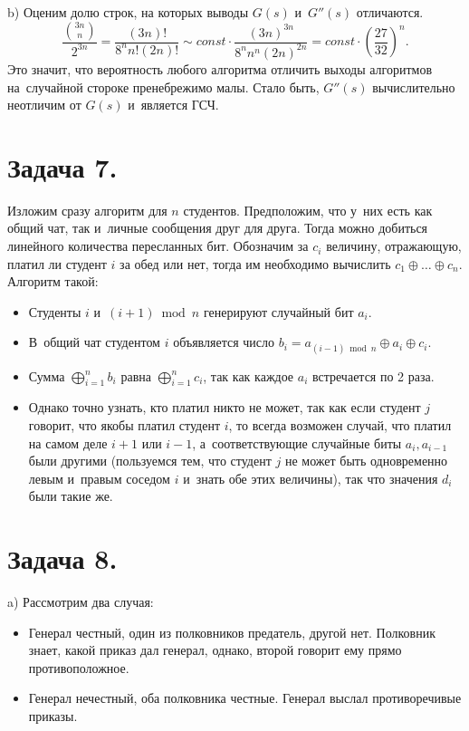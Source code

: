 \documentclass{article}
\begin{document}
b) Оценим долю строк, на которых выводы $G(s)$ и~$G''(s)$ отличаются.
$$\frac{{3n \choose n}}{2^{3n}} = \frac{(3n)!}{8^n n! (2n)!} \sim const \cdot
\frac{(3n)^{3n}}{8^n n^n (2n)^{2n}} = const \cdot
\left(\frac{27}{32}\right)^n.$$
Это значит, что вероятность любого алгоритма отличить выходы алгоритмов
на~случайной стороке пренебрежимо малы. Стало быть, $G''(s)$ вычислительно
неотличим от $G(s)$ и~является ГСЧ.

\section*{Задача 7.}

Изложим сразу алгоритм для $n$ студентов. Предположим, что у~них есть как общий
чат, так и~личные сообщения друг для друга. Тогда можно добиться линейного
количества пересланных бит. Обозначим за $c_i$ величину, отражающую, платил ли
студент $i$ за обед или нет, тогда им необходимо вычислить $c_1 \oplus \ldots
\oplus c_n$. Алгоритм такой:
\begin{itemize}
	\item Студенты $i$ и~$(i+1) \bmod n$ генерируют случайный бит $a_i$.
	\item В~общий чат студентом $i$ объявляется число $b_i = a_{(i-1) \bmod n}
		\oplus a_{i} \oplus c_i$.
	\item Сумма $\bigoplus\limits_{i=1}^n b_i$ равна $\bigoplus\limits_{i=1}^n
		c_i$, так как каждое $a_i$ встречается по 2 раза.
	\item Однако точно узнать, кто платил никто не может, так как если студент $j$
		говорит, что якобы платил студент $i$, то всегда возможен случай, что платил
		на самом деле $i+1$ или $i-1$, а~соответствующие случайные биты
		$a_i,a_{i-1}$ были другими (пользуемся тем, что студент $j$ не может быть
		одновременно левым и~правым соседом $i$ и~знать обе этих величины), так что
		значения $d_i$ были такие же.
\end{itemize}

\section*{Задача 8.}

a) Рассмотрим два случая:
\begin{itemize}
	\item Генерал честный, один из полковников предатель, другой нет. Полковник
		знает, какой приказ дал генерал, однако, второй говорит ему прямо
		противоположное.
	\item Генерал нечестный, оба полковника честные. Генерал выслал противоречивые
		приказы.
\end{itemize}
\end{document}
